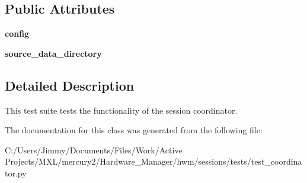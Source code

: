 \subsection*{Public Attributes}
\begin{DoxyCompactItemize}
\item 
\hypertarget{classhwm_1_1sessions_1_1tests_1_1test__coordinator_1_1_test_coordinator_a3f7b40a4155ad7addb3dff58a7bf736a}{{\bfseries config}}\label{classhwm_1_1sessions_1_1tests_1_1test__coordinator_1_1_test_coordinator_a3f7b40a4155ad7addb3dff58a7bf736a}

\item 
\hypertarget{classhwm_1_1sessions_1_1tests_1_1test__coordinator_1_1_test_coordinator_a0967f2e46b04d37f832d79e45121ca29}{{\bfseries source\-\_\-data\-\_\-directory}}\label{classhwm_1_1sessions_1_1tests_1_1test__coordinator_1_1_test_coordinator_a0967f2e46b04d37f832d79e45121ca29}

\end{DoxyCompactItemize}


\subsection{Detailed Description}
This test suite tests the functionality of the session coordinator. 

The documentation for this class was generated from the following file\-:\begin{DoxyCompactItemize}
\item 
C\-:/\-Users/\-Jimmy/\-Documents/\-Files/\-Work/\-Active Projects/\-M\-X\-L/mercury2/\-Hardware\-\_\-\-Manager/hwm/sessions/tests/test\-\_\-coordinator.\-py\end{DoxyCompactItemize}
